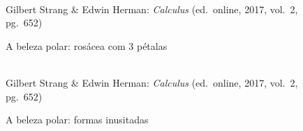 \begin{figure}[H]
  \begin{center}
    \caption{A beleza polar: rosácea com 3 pétalas}
    \label{fig:belo5}
    \\
    \footnotesize{Gilbert Strang \& Edwin Herman: \emph{Calculus}
          (ed.\ online, 2017, vol.\ 2, pg.\ 652)}
  \end{center}
\end{figure}

\begin{figure}[H]
  \begin{center}
    \caption{A beleza polar: formas inusitadas}
    \label{fig:belo6}
    \\
    \footnotesize{Gilbert Strang \& Edwin Herman: \emph{Calculus}
         (ed.\ online, 2017, vol.\ 2, pg.\ 652)}
  \end{center}
\end{figure}

